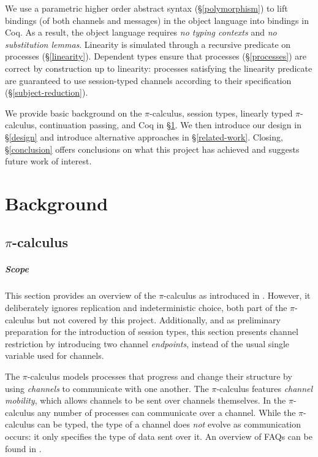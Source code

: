 \documentclass{mproj}
\newcommand{\picalc}{$\pi$-calculus}
\begin{document}
We use a parametric higher order abstract syntax \cite{Chlipala2008} (\S \ref{polymorphism}) to lift bindings (of both channels and messages) in the object language into bindings in Coq. As a result, the object language requires \emph{no typing contexts} and \emph{no substitution lemmas}. Linearity is simulated through a recursive predicate on processes (\S \ref{linearity}). Dependent types ensure that processes (\S \ref{processes}) are correct by construction up to linearity: processes satisfying the linearity predicate are guaranteed to use session-typed channels according to their specification (\S \ref{subject-reduction}).

We provide basic background on the \picalc{}, session types, linearly typed \picalc{}, continuation passing, and Coq in \S \ref{background}. We then introduce our design in \S \ref{design} and introduce alternative approaches in \S \ref{related-work}. Closing, \S \ref{conclusion} offers conclusions on what this project has achieved and suggests future work of interest.

\chapter{Background}\label{background}

\section{\picalc}\label{pi-calculus}

\paragraph{Scope} This section provides an overview of the \picalc{} as introduced in \cite{Sangiorgi2001}. However, it deliberately ignores replication and indeterministic choice, both part of the \picalc{} but not covered by this project. Additionally, and as preliminary preparation for the introduction of session types, this section presents channel restriction by introducing two channel \emph{endpoints}, instead of the usual single variable used for channels.

The \picalc{} \cite{Walker1989,Milner1989,Milner1991,Sangiorgi2001} models processes that progress and change their structure by using \emph{channels} to communicate with one another. The \picalc{} features \emph{channel mobility}, which allows channels to be sent over channels themselves. In the \picalc{} any number of processes can communicate over a channel. While the \picalc{} can be typed, the type of a channel does \emph{not} evolve as communication occurs: it only specifies the type of data sent over it. An overview of FAQs can be found in \cite{Wing2002}.
\end{document}
